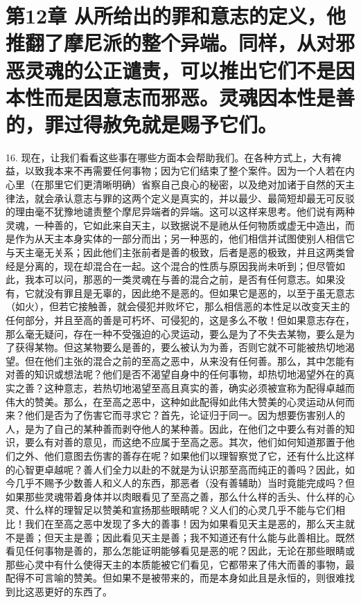 
\section{第12章 从所给出的罪和意志的定义，他推翻了摩尼派的整个异端。同样，从对邪恶灵魂的公正谴责，可以推出它们不是因本性而是因意志而邪恶。灵魂因本性是善的，罪过得赦免就是赐予它们。}

16. 现在，让我们看看这些事在哪些方面本会帮助我们。在各种方式上，大有裨益，以致我本来不再需要任何事物；因为它们结束了整个案件。因为一个人若在内心里（在那里它们更清晰明确）省察自己良心的秘密，以及绝对加诸于自然的天主律法，就会承认意志与罪的这两个定义是真实的，并以最少、最简短却最无可反驳的理由毫不犹豫地谴责整个摩尼异端者的异端。这可以这样来思考。他们说有两种灵魂，一种善的，它如此来自天主，以致据说不是祂从任何物质或虚无中造出，而是作为从天主本身实体的一部分而出；另一种恶的，他们相信并试图使别人相信它与天主毫无关系；因此他们主张前者是善的极致，后者是恶的极致，并且这两类曾经是分离的，现在却混合在一起。这个混合的性质与原因我尚未听到；但尽管如此，我本可以问，那恶的一类灵魂在与善的混合之前，是否有任何意志。如果没有，它就没有罪且是无辜的，因此绝不是恶的。但如果它是恶的，以至于虽无意志（如火），但若它接触善，就会侵犯并败坏它，那么相信恶的本性足以改变天主的任何部分，并且至高的善是可朽坏、可侵犯的，这是多么不敬！但如果意志存在，那么毫无疑问，存在一种不受强迫的心灵运动，要么是为了不失去某物，要么是为了获得某物。但这某物要么是善的，要么被认为为善，否则它就不可能被热切地渴望。但在他们主张的混合之前的至高之恶中，从来没有任何善。那么，其中怎能有对善的知识或想法呢？他们是否不渴望自身中的任何事物，却热切地渴望外在的真实之善？这种意志，若热切地渴望至高且真实的善，确实必须被宣称为配得卓越而伟大的赞美。那么，在至高之恶中，这种如此配得如此伟大赞美的心灵运动从何而来？他们是否为了伤害它而寻求它？首先，论证归于同一。因为想要伤害别人的人，是为了自己的某种善而剥夺他人的某种善。因此，在他们之中要么有对善的知识，要么有对善的意见，而这绝不应属于至高之恶。其次，他们如何知道那置于他们之外、他们意图去伤害的善存在呢？如果他们以理智察觉了它，还有什么比这样的心智更卓越呢？善人们全力以赴的不就是为认识那至高而纯正的善吗？因此，如今几乎不赐予少数善人和义人的东西，那恶者（没有善辅助）当时竟能完成吗？但如果那些灵魂带着身体并以肉眼看见了至高之善，那么什么样的舌头、什么样的心灵、什么样的理智足以赞美和宣扬那些眼睛呢？义人们的心灵几乎不能与它们相比！我们在至高之恶中发现了多大的善事！因为如果看见天主是恶的，那么天主就不是善；但天主是善；因此看见天主是善；我不知道还有什么能与此善相比。既然看见任何事物是善的，那么怎能证明能够看见是恶的呢？因此，无论在那些眼睛或那些心灵中有什么使得天主的本质能被它们看见，它都带来了伟大而善的事物，最配得不可言喻的赞美。但如果不是被带来的，而是本身如此且是永恒的，则很难找到比这恶更好的东西了。\par

